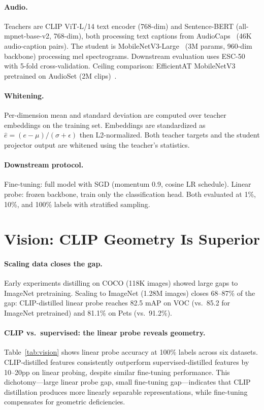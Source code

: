 \documentclass{article}
\begin{document}
\paragraph{Audio.}
Teachers are CLIP ViT-L/14 text encoder (768-dim) and Sentence-BERT (all-mpnet-base-v2, 768-dim), both processing text captions from AudioCaps~\citep{kim2019audiocaps} (46K audio-caption pairs).
The student is MobileNetV3-Large~\citep{howard2019searching} (3M params, 960-dim backbone) processing mel spectrograms.
Downstream evaluation uses ESC-50~\citep{piczak2015esc} with 5-fold cross-validation.
Ceiling comparison: EfficientAT MobileNetV3 pretrained on AudioSet (2M clips)~\citep{koutini2022efficient}.

\paragraph{Whitening.}
Per-dimension mean and standard deviation are computed over teacher embeddings on the training set.
Embeddings are standardized as $\hat{e} = (e - \mu) / (\sigma + \epsilon)$ then L2-normalized.
Both teacher targets and the student projector output are whitened using the teacher's statistics.

\paragraph{Downstream protocol.}
Fine-tuning: full model with SGD (momentum 0.9, cosine LR schedule).
Linear probe: frozen backbone, train only the classification head.
Both evaluated at 1\%, 10\%, and 100\% labels with stratified sampling.

\section{Vision: CLIP Geometry Is Superior}
\label{sec:vision}

\paragraph{Scaling data closes the gap.}
Early experiments distilling on COCO (118K images) showed large gaps to ImageNet pretraining.
Scaling to ImageNet (1.28M images) closes 68--87\% of the gap: CLIP-distilled linear probe reaches 82.5 mAP on VOC (vs.\ 85.2 for ImageNet pretrained) and 81.1\% on Pets (vs.\ 91.2\%).

\paragraph{CLIP vs.\ supervised: the linear probe reveals geometry.}
Table~\ref{tab:vision} shows linear probe accuracy at 100\% labels across six datasets.
CLIP-distilled features consistently outperform supervised-distilled features by 10--20pp on linear probing, despite similar fine-tuning performance.
This dichotomy---large linear probe gap, small fine-tuning gap---indicates that CLIP distillation produces more linearly separable representations, while fine-tuning compensates for geometric deficiencies.
\end{document}
